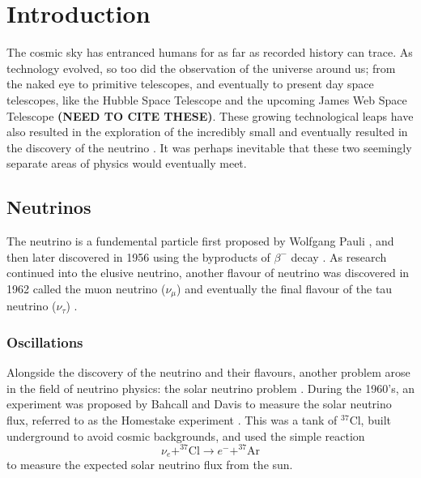 \chapter{Introduction}

The cosmic sky has entranced humans for as far as recorded history can trace. As technology evolved, so too did the observation of the universe around us; from the naked eye to primitive telescopes, and eventually to present day space telescopes, like the Hubble Space Telescope and the upcoming James Web Space Telescope \textbf{(NEED TO CITE THESE)}. These growing technological leaps have also resulted in the exploration of the incredibly small and eventually resulted in the discovery of the neutrino \cite{aneut}. It was perhaps inevitable that these two seemingly separate areas of physics would eventually meet. 

\section{Neutrinos}

The neutrino is a fundemental particle first proposed by Wolfgang Pauli \cite{nu_proposition}, and then later discovered in 1956 using the byproducts of $\beta^{-}$ decay \cite{aneut}. As research continued into the elusive neutrino, another flavour of neutrino was discovered in 1962 called the muon neutrino ($\nu_{\mu}$) \cite{m_nu} and eventually the final flavour of the tau neutrino ($\nu_\tau$) \cite{t_nu}. 

\subsection{Oscillations}

Alongside the discovery of the neutrino and their flavours, another problem arose in the field of neutrino physics: the solar neutrino problem \cite{lowe_nu}. During the 1960's, an experiment was proposed by Bahcall and Davis to measure the solar neutrino flux, referred to as the Homestake experiment \cite{davis, bahcall}. This was a tank of $^{37}$Cl, built underground to avoid cosmic backgrounds, and used the simple reaction\cite{davis, bahcall}
\begin{equation}\label{eq:cl}
  \nu_{e} + ^{37}\text{Cl} \to e^{-} + ^{37}\text{Ar}
\end{equation}
to measure the expected solar neutrino flux from the sun. 

